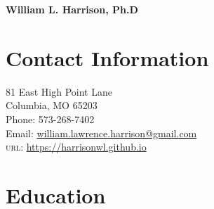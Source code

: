 \documentclass[12pt]{article} %
\begin{document}


{\LARGE\bfseries William L. Harrison, Ph.D} %
\medskip %

\section*{Contact Information}

81 East High Point Lane %
\\
Columbia, MO 65203
\\
Phone: 573-268-7402
\\ 
Email: \href{mailto:william.lawrence.harrison@gmail.com}{william.lawrence.harrison@gmail.com}
\\
\textsc{url}: \href{https://harrisonwl.github.io}{https://harrisonwl.github.io}


\section*{Education}
\end{document}

